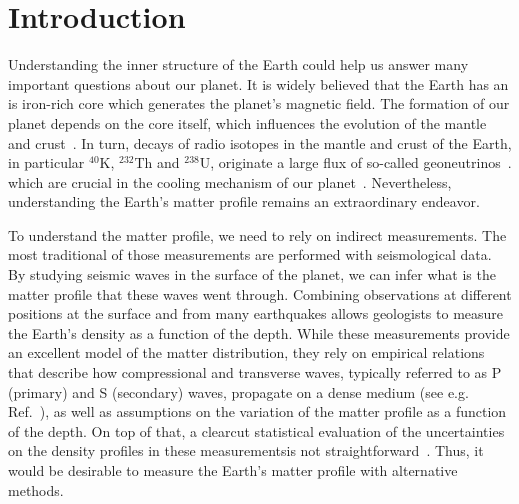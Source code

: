 \section{Introduction}
\label{sec:Introduction}


Understanding the inner structure of the Earth could help us answer many important questions about our planet. 
It is widely believed that the Earth has an is iron-rich core which generates the planet's magnetic field. 
The formation of our planet depends on the core itself, which influences the evolution of the mantle and crust~\cite{Condie}. 
In turn, decays of radio isotopes in the mantle and crust of the Earth, in particular $^{40}$K, $^{232}$Th and $^{238}$U, originate a large flux of so-called geoneutrinos~\cite{KamLAND:2011ayp, KamLAND:2013rgu, Borexino:2019gps}. 
which are crucial in the cooling mechanism of our planet~\cite{davies2010earth, McDonough:2019ldt}.
Nevertheless, understanding the Earth's matter profile remains an extraordinary endeavor.

To understand the matter profile, we need to rely on indirect measurements.
The most traditional of those measurements are performed with seismological data.
By studying seismic waves in the surface of the planet, we can infer what is the matter profile that these waves went through.
Combining observations at different positions at the surface and from many earthquakes allows geologists to measure the Earth's density as a function of the depth.
While these measurements provide an excellent model of the matter distribution, they rely on empirical relations that describe how compressional and transverse waves, typically referred to as P (primary) and S (secondary) waves, propagate on a dense medium (see e.g. Ref.~\cite{Geller:2001ix}), as well as assumptions on the variation of the matter profile as a function of the depth.
On top of that, a clearcut statistical evaluation of the uncertainties on the density profiles in these measurementsis not straightforward~\cite{Kenneth1998}.
Thus, it would be desirable to measure the Earth's matter profile with alternative methods.

